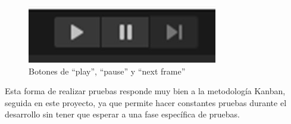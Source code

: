 \begin{figure}[h]
    \centering
    \includegraphics[scale=0.45]{img/PlayPauseNextframe.jpg}
    \caption{Botones de ``play'', ``pause'' y ``next frame''}
    \label{fig:}
    \end{figure}

Esta forma de realizar pruebas responde muy bien a la metodología Kanban, seguida en este proyecto, ya que permite hacer constantes pruebas durante el desarrollo sin tener que esperar a una fase específica de pruebas.

